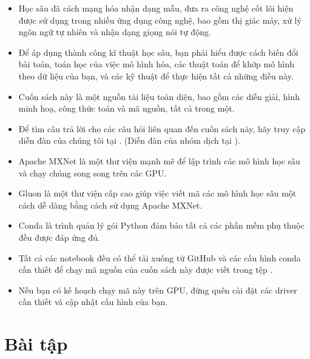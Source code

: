 \documentclass[letterpaper,11pt,english]{sphinxmanual}
\begin{document}
\begin{itemize}
\item {} 
Học sâu đã cách mạng hóa nhận dạng mẫu, đưa ra công nghệ cốt lõi hiện
được sử dụng trong nhiều ứng dụng công nghệ, bao gồm thị giác máy, xử
lý ngôn ngữ tự nhiên và nhận dạng giọng nói tự động.

\item {} 
Để áp dụng thành công kĩ thuật học sâu, bạn phải hiểu được cách biến
đổi bài toán, toán học của việc mô hình hóa, các thuật toán để khớp
mô hình theo dữ liệu của bạn, và các kỹ thuật để thực hiện tất cả
những điều này.

\item {} 
Cuốn sách này là một nguồn tài liệu toàn diện, bao gồm các diễn giải,
hình minh hoạ, công thức toán và mã nguồn, tất cả trong một.

\item {} 
Để tìm câu trả lời cho các câu hỏi liên quan đến cuốn sách này, hãy
truy cập diễn đàn của chúng tôi tại . (Diễn
đàn của nhóm dịch tại ).

\item {} 
Apache MXNet là một thư viện mạnh mẽ để lập trình các mô hình học sâu
và chạy chúng song song trên các GPU.

\item {} 
Gluon là một thư viện cấp cao giúp việc viết mã các mô hình học sâu
một cách dễ dàng bằng cách sử dụng Apache MXNet.

\item {} 
Conda là trình quản lý gói Python đảm bảo tất cả các phần mềm phụ
thuộc đều được đáp ứng đủ.

\item {} 
Tất cả các notebook đều có thể tải xuống từ GitHub và các cấu hình
conda cần thiết để chạy mã nguồn của cuốn sách này được viết trong
tệp .

\item {} 
Nếu bạn có kế hoạch chạy mã này trên GPU, đừng quên cài đặt các
driver cần thiết và cập nhật cấu hình của bạn.

\end{itemize}




\section{Bài tập}
\label{\detokenize{chapter_preface/index_vn:bai-tap}}
\end{document}
